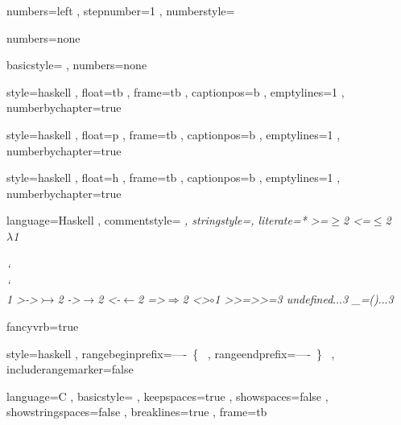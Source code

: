 \usepackage{xcolor}
\usepackage{fancyvrb}
\usepackage[scaled]{beramono}


    { numbers=left
    , stepnumber=1
    , numberstyle=\tiny
    }

    { numbers=none
    }

    {
    }

    { basicstyle=\color{red}\ttfamily
    , numbers=none
    }

    { style=haskell
    , float=tb
    , frame=tb
    , captionpos=b
    , emptylines=1
    , numberbychapter=true
    }

    { style=haskell
    , float=p
    , frame=tb
    , captionpos=b
    , emptylines=1
    , numberbychapter=true
    }

    { style=haskell
    , float=h
    , frame=tb
    , captionpos=b
    , emptylines=1
    , numberbychapter=true
    }

    { language=Haskell
    , commentstyle=\color[rgb]{0.38,0.63,0.69}\itshape
    , stringstyle=\textcolor[rgb]{0.25,0.44,0.63}
    , literate=*
        {>=}{{$\geq$}}2
        {<=}{{$\leq$}}2
        {\\}{{$\lambda$}}1
        {\\\\}{{\char`\\\char`\\}}1
        {>->}{{$\rightarrowtail$}}2
        {->}{{$\rightarrow$}}2
        {<-}{{$\leftarrow$}}2
        {=>}{{$\Rightarrow$}}2
        {<>}{{$\circ$}}1
        {>>=}{{>>=}}3
        {undefined}{{$\ldots$}}3
        {_=()}{{$\ldots$}}3
    }

    { fancyvrb=true
    }

    { style=haskell
    , rangebeginprefix=----\ \{\ %
    , rangeendprefix=----\ \}\ %
    , includerangemarker=false
    }

\lstset
    { language=C
    , basicstyle=\fontsize{8}{10}\ttfamily
    , keepspaces=true
    , showspaces=false
    , showstringspaces=false
    , breaklines=true
    , frame=tb
    }
\lstset{ style=numbers
       , captionpos=b
       }
